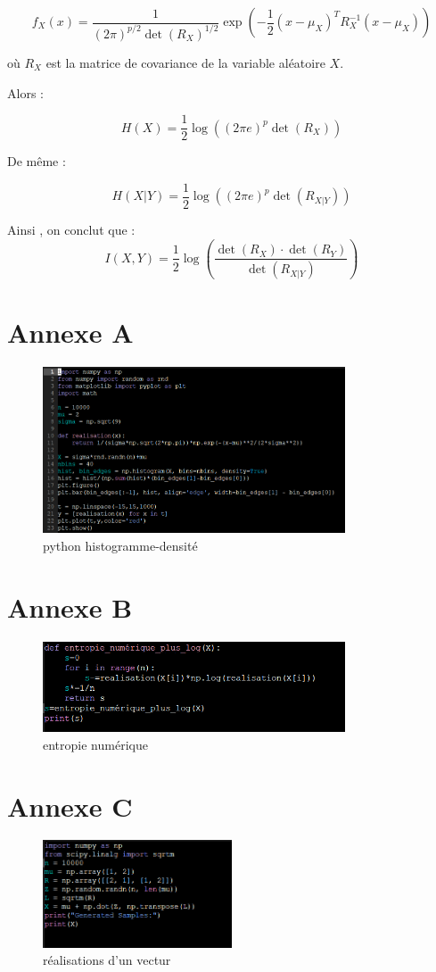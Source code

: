 \documentclass[a4paper]{article}
\begin{document}
\[ f_X(x) = \frac{1}{(2\pi)^{p/2} \det(R_X)^{1/2}} \exp\left(-\frac{1}{2} (x - \mu_X)^T R_X^{-1} (x - \mu_X)\right) \]

où \(R_X\) est la matrice de covariance de la variable aléatoire \(X\).

Alors :

\[ H(X) = \frac{1}{2} \log((2\pi e)^p \det(R_X)) \]

De même :

\[ H(X | Y) = \frac{1}{2} \log((2\pi e)^p \det(R_{X|Y})) \]

Ainsi , on conclut que :
\[ I(X, Y) = \frac{1}{2} \log\left(\frac{\det(R_X) \cdot \det(R_Y)}{\det(R_{X|Y})}\right) \]

\newpage
\appendix
\section{Annexe A}
\begin{figure}[h]
  \centering
  \includegraphics[width=0.8\textwidth]{1.png}
  \caption{python histogramme-densité}
\end{figure}

\section{Annexe B}
\begin{figure}[h]
  \centering
  \includegraphics[width=0.8\textwidth]{4.png}
  \caption{entropie numérique}
\end{figure}
\section{Annexe C}
\begin{figure}[h]
  \centering
  \includegraphics[width=0.5\textwidth]{5.png}
  \caption{réalisations d'un vectur}
\end{figure}
\newpage
\end{document}
